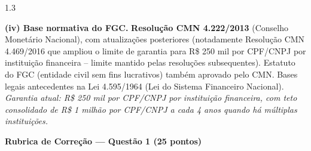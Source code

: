 \documentclass[11pt,addpoints]{exam}
\begin{document}
\begin{spacing}{1.3}
\begin{questions}
\begin{parts}
\begin{solution}
\textbf{(iv) Base normativa do FGC.} \textbf{Resolução CMN 4.222/2013} (Conselho Monetário Nacional), com atualizações posteriores (notadamente Resolução CMN 4.469/2016 que ampliou o limite de garantia para R\$ 250 mil por CPF/CNPJ por instituição financeira -- limite mantido pelas resoluções subsequentes). Estatuto do FGC (entidade civil sem fins lucrativos) também aprovado pelo CMN. Bases legais antecedentes na Lei 4.595/1964 (Lei do Sistema Financeiro Nacional). \emph{Garantia atual: R\$ 250 mil por CPF/CNPJ por instituição financeira, com teto consolidado de R\$ 1 milhão por CPF/CNPJ a cada 4 anos quando há múltiplas instituições.}
\end{solution}

\end{parts}

\ifprintanswers
\vspace{1em}
{\color{rubred}
\noindent\textbf{Rubrica de Correção --- Questão 1 (25 pontos)}
\vspace{0.3em}

}
\end{questions}
\end{spacing}
\end{document}
